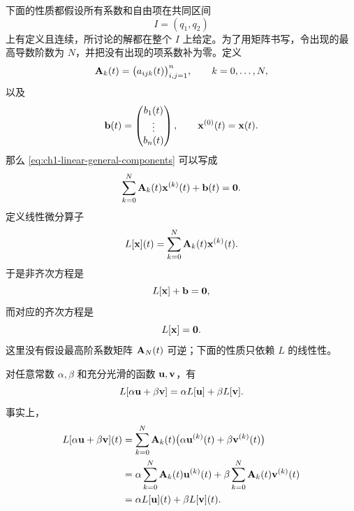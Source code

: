 下面的性质都假设所有系数和自由项在共同区间
\[
 I=(q_1,q_2)
\]
上有定义且连续，所讨论的解都在整个 \(I\) 上给定。为了用矩阵书写，令出现的最高导数阶数为 \(N\)，并把没有出现的项系数补为零。定义
\begin{equation}
 \mathbf{A}_k(t)=\bigl(a_{ijk}(t)\bigr)_{i,j=1}^{n},
 \qquad
 k=0,\ldots,N,
 \label{eq:ch1-linear-coefficient-matrices}
\end{equation}
以及
\begin{equation}
 \vect{b}(t)=
 \begin{pmatrix}
  b_1(t)\\
  \vdots\\
  b_n(t)
 \end{pmatrix},
 \qquad
 \vect{x}^{(0)}(t)=\vect{x}(t).
 \label{eq:ch1-linear-forcing-vector}
\end{equation}
那么 \eqref{eq:ch1-linear-general-components} 可以写成
\begin{equation}
 \sum_{k=0}^{N}\mat{A}_k(t)\vect{x}^{(k)}(t)+\vect{b}(t)=\vect{0}.
 \label{eq:ch1-linear-matrix-general}
\end{equation}
定义线性微分算子
\begin{equation}
 L[\vect{x}](t)=\sum_{k=0}^{N}\mat{A}_k(t)\vect{x}^{(k)}(t).
 \label{eq:ch1-linear-operator}
\end{equation}
于是非齐次方程是
\begin{equation}
 L[\vect{x}]+\vect{b}=\vect{0},
 \label{eq:ch1-linear-operator-equation}
\end{equation}
而对应的齐次方程是
\begin{equation}
 L[\vect{x}]=\vect{0}.
 \label{eq:ch1-linear-operator-homogeneous}
\end{equation}
这里没有假设最高阶系数矩阵 \(\mathbf{A}_N(t)\) 可逆；下面的性质只依赖 \(L\) 的线性性。

对任意常数 \(\alpha,\beta\) 和充分光滑的函数 \(\vect{u},\vect{v}\)，有
\begin{equation}
 L[\alpha \vect{u}+\beta \vect{v}]
 =\alpha L[\vect{u}]+\beta L[\vect{v}].
 \label{eq:ch1-linear-operator-linearity}
\end{equation}
事实上，
\[
 \begin{aligned}
 L[\alpha \vect{u}+\beta \vect{v}](t)
 &=\sum_{k=0}^{N}\mat{A}_k(t)
  \bigl(\alpha \vect{u}^{(k)}(t)+\beta \vect{v}^{(k)}(t)\bigr)\\
 &=\alpha\sum_{k=0}^{N}\mat{A}_k(t)\vect{u}^{(k)}(t)
  +\beta\sum_{k=0}^{N}\mat{A}_k(t)\vect{v}^{(k)}(t)\\
 &=\alpha L[\vect{u}](t)+\beta L[\vect{v}](t).
 \end{aligned}
\]

